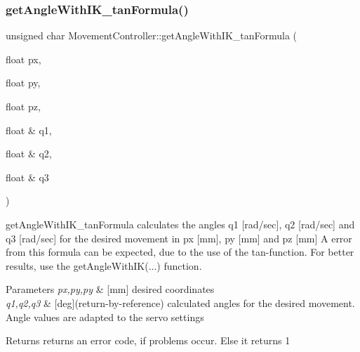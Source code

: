 \subsubsection{\texorpdfstring{get\+Angle\+With\+I\+K\+\_\+tan\+Formula()}{getAngleWithIK\_tanFormula()}}
{\footnotesize\ttfamily unsigned char Movement\+Controller\+::get\+Angle\+With\+I\+K\+\_\+tan\+Formula (\begin{DoxyParamCaption}\item[{float}]{px,  }\item[{float}]{py,  }\item[{float}]{pz,  }\item[{float \&}]{q1,  }\item[{float \&}]{q2,  }\item[{float \&}]{q3 }\end{DoxyParamCaption})}

get\+Angle\+With\+I\+K\+\_\+tan\+Formula  calculates the angles q1 \mbox{[}rad/sec\mbox{]}, q2 \mbox{[}rad/sec\mbox{]} and q3 \mbox{[}rad/sec\mbox{]} for the desired movement in px \mbox{[}mm\mbox{]}, py \mbox{[}mm\mbox{]} and pz \mbox{[}mm\mbox{]} A error from this formula can be expected, due to the use of the tan-\/function. For better results, use the \textquotesingle{}get\+Angle\+With\+IK(...)\textquotesingle{} function. 
\begin{DoxyParams}{Parameters}
{\em px,py,py} & \mbox{[}mm\mbox{]} desired coordinates \\
\hline
{\em q1,q2,q3} & \mbox{[}deg\mbox{]}(return-\/by-\/reference) calculated angles for the desired movement. Angle values are adapted to the servo settings \\
\hline
\end{DoxyParams}
\begin{DoxyReturn}{Returns}
returns an error code, if problems occur. Else it returns 1 
\end{DoxyReturn}
\mbox{\label{class_movement_controller_a0710b423644d46f7391e4b75c5879559}} 
